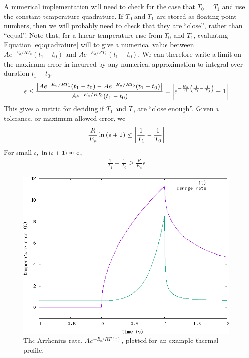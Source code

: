 \documentclass{article}
\begin{document}
A numerical implementation will need to check for the case that $T_0 = T_1$ and use the constant temperature quadrature. If $T_0$ and $T_1$ are stored as floating point numbers, then
we will probably need to check that they are ``close'', rather than ``equal''. Note that, for a linear temperature rise from $T_0$ and $T_1$, evaluating Equation \ref{eq:quadrature} will
to give a numerical value between $Ae^{-E_a/RT_0}(t_1 - t_0)$ and $Ae^{-E_a/RT_1}(t_1 - t_0)$. We can therefore write a limit on the maximum error in incurred by any numerical approximation to integral over duration $t_1 - t_0$.
\begin{align}
  \epsilon \le \frac{\abs{ Ae^{-E_a/RT_1}(t_1 - t_0) - Ae^{-E_a/RT_0}(t_1 - t_0)} }{Ae^{-E_a/RT_0}(t_1 - t_0)} = \abs{e^{-\frac{E_a}{R} \qty(\frac{1}{T_1} - \frac{1}{T_0})} - 1}
\end{align}
This gives a metric for deciding if $T_1$ and $T_0$ are ``close enough''. Given a tolerance, or maximum allowed error, we 
\begin{align}
  \frac{R}{E_a} \ln \qty( \epsilon + 1 ) \le \abs{ \frac{1}{T_1} - \frac{1}{T_0} }
\end{align}
For small $\epsilon$, $\ln \qty(\epsilon + 1) \approx \epsilon$,
\begin{align}
 \frac{1}{T_1} - \frac{1}{T_0} \ge \frac{R}{E_a}\epsilon
\end{align}



\begin{figure}
\includegraphics{./arrhenius_rate.png}
\caption{\label{fig:arrhenius_rate} The Arrhenius rate, $Ae^{-E_a/RT(t)}$, plotted for an example thermal profile. }
\end{figure}




\end{document}
